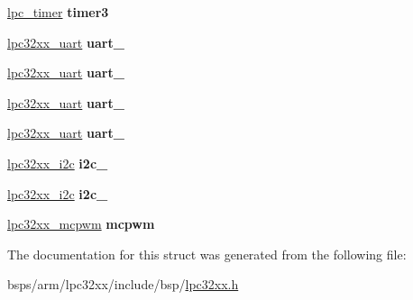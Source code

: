 \begin{DoxyCompactItemize}
\mbox{\label{structlpc32xx__registers_a1b94f0a372e0a867957a99596342aa67}} 
\mbox{\hyperlink{structlpc__timer}{lpc\+\_\+timer}} {\bfseries timer3}
\item 
\mbox{\label{structlpc32xx__registers_a8ac3b44d3cd1b860a4430772aded2733}} 
\mbox{\hyperlink{structlpc32xx__uart}{lpc32xx\+\_\+uart}} {\bfseries uart\+\_}
\item 
\mbox{\label{structlpc32xx__registers_a2fa8fb5132b5b5aeeb9461333c9f8893}} 
\mbox{\hyperlink{structlpc32xx__uart}{lpc32xx\+\_\+uart}} {\bfseries uart\+\_}
\item 
\mbox{\label{structlpc32xx__registers_a365b834e79309cd9a766ad1bfa3deb47}} 
\mbox{\hyperlink{structlpc32xx__uart}{lpc32xx\+\_\+uart}} {\bfseries uart\+\_}
\item 
\mbox{\label{structlpc32xx__registers_a75fde07472ebf269ec64944a1cd276c7}} 
\mbox{\hyperlink{structlpc32xx__uart}{lpc32xx\+\_\+uart}} {\bfseries uart\+\_}
\item 
\mbox{\label{structlpc32xx__registers_a10c36da3b52408425d3a1006be989a09}} 
\mbox{\hyperlink{structlpc32xx__i2c}{lpc32xx\+\_\+i2c}} {\bfseries i2c\+\_}
\item 
\mbox{\label{structlpc32xx__registers_ad9d39982b01adbf6bd3af0711c70487b}} 
\mbox{\hyperlink{structlpc32xx__i2c}{lpc32xx\+\_\+i2c}} {\bfseries i2c\+\_}
\item 
\mbox{\label{structlpc32xx__registers_a8dcfcae0ac43caa865b8e5dcb027dba5}} 
\mbox{\hyperlink{structlpc32xx__mcpwm}{lpc32xx\+\_\+mcpwm}} {\bfseries mcpwm}
\end{DoxyCompactItemize}


The documentation for this struct was generated from the following file\+:\begin{DoxyCompactItemize}
\item 
bsps/arm/lpc32xx/include/bsp/\mbox{\hyperlink{lpc32xx_8h}{lpc32xx.\+h}}\end{DoxyCompactItemize}
